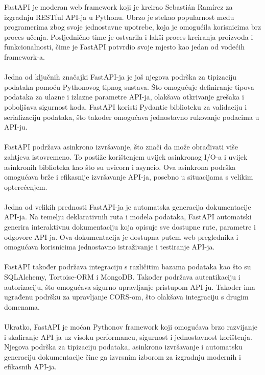 	FastAPI je moderan web framework koji je kreirao Sebastián Ramírez za izgradnju RESTful API-ja u Pythonu. Ubrzo je stekao popularnost među programerima zbog svoje jednostavne upotrebe, koja je omogućila korisnicima brz proces učenja. Posljednično time je ostvarila i lakši proces kreiranja proizvoda i funkcionalnosti, čime je FastAPI potvrdio svoje mjesto kao jedan  od vodećih framework-a.
	\\ \\
	Jedna od ključnih značajki FastAPI-ja je još njegova podrška za tipizaciju podataka pomoću Pythonovog tipnog sustava. Što omogućuje definiranje tipova podataka za ulazne i izlazne parametre API-ja, olakšava otkrivanje grešaka i poboljšava sigurnost koda. FastAPI koristi Pydantic biblioteku za validaciju i serializaciju podataka, što također omogućava jednostavno rukovanje podacima u API-ju.
	\\ \\
	FastAPI podržava asinkrono izvršavanje, što znači da može obrađivati više zahtjeva istovremeno. To postiže korištenjem uvijek asinkronog I/O-a i uvijek asinkronih biblioteka kao što su uvicorn i asyncio. Ova asinkrona podrška omogućava brže i efikasnije izvršavanje API-ja, posebno u situacijama s velikim opterećenjem.
	\\ \\
	Jedna od velikih prednosti FastAPI-ja je automatska generacija dokumentacije API-ja. Na temelju deklarativnih ruta i modela podataka, FastAPI automatski generira interaktivnu dokumentaciju koja opisuje sve dostupne rute, parametre i odgovore API-ja. Ova dokumentacija je dostupna putem web preglednika i omogućava korisnicima jednostavno istraživanje i testiranje API-ja.
	\\ \\
	FastAPI također podržava integraciju s različitim bazama podataka kao što su SQLAlchemy, Tortoise-ORM i MongoDB. Također podržava autentikaciju i autorizaciju, što omogućava sigurno upravljanje pristupom API-ju. Također ima ugrađenu podršku za upravljanje CORS-om, što olakšava integraciju s drugim domenama.
	\\ \\
	Ukratko, FastAPI je moćan Pythonov framework koji omogućava brzo razvijanje i skaliranje API-ja uz visoku performancu, sigurnost i jednostavnost korištenja. Njegova podrška za tipizaciju podataka, asinkrono izvršavanje i automatsku generaciju dokumentacije čine ga izvrsnim izborom za izgradnju modernih i efikasnih API-ja.

	\bigskip

